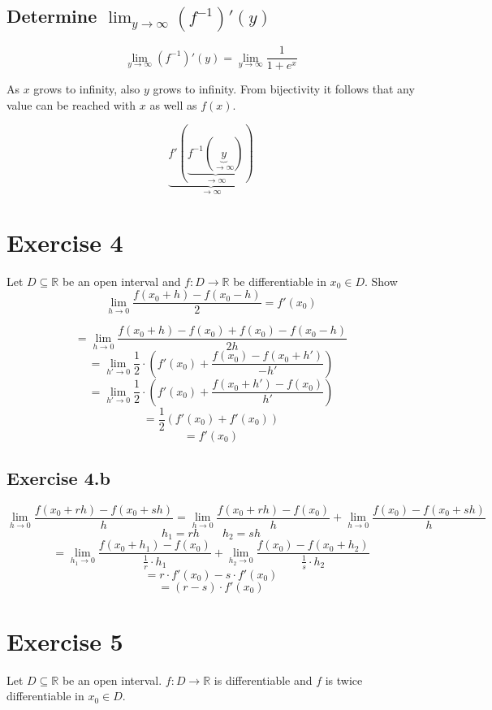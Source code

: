 \documentclass[a4paper]{article}
\theoremstyle{definition}
\begin{document}
\subsection{Determine $\lim_{y\to\infty} \left(f^{-1}\right)'(y)$}
%
\[
  \lim_{y\to\infty} \left(f^{-1}\right)'(y)
  = \lim_{y\to\infty} \frac{1}{1 + e^x}
\]

As $x$ grows to infinity, also $y$ grows to infinity.
From bijectivity it follows that any value can be reached with $x$ as well as $f(x)$.

\[ \underbrace{f'(\underbrace{f^{-1}(\underbrace{y}_{\to\infty})}_{\to\infty})}_{\to\infty} \]

\section{Exercise 4}
\begin{ex}
  Let $D \subseteq \mathbb R$ be an open interval and $f: D \to \mathbb R$ be differentiable
  in $x_0 \in D$.
  Show
  \[ \lim_{h\to0} \frac{f(x_0 + h) - f(x_0 - h)}{2} = f'(x_0) \]
\end{ex}

\[ = \lim_{h\to0} \frac{f(x_0 + h) - f(x_0) + f(x_0) - f(x_0 - h)}{2h} \]
\[ = \lim_{h'\to 0} \frac12 \cdot \left(f'(x_0) + \frac{f(x_0) - f(x_0 + h')}{-h'}\right) \]
\[ = \lim_{h'\to 0} \frac12 \cdot \left(f'(x_0) + \frac{f(x_0 + h') - f(x_0)}{h'}\right) \]
\[ = \frac12 (f'(x_0) + f'(x_0)) \]
\[ = f'(x_0) \]

\subsection{Exercise 4.b}
\[
  \lim_{h\to0} \frac{f(x_0 + rh) - f(x_0 + sh)}{h}
    = \lim_{h\to0} \frac{f(x_0 + rh) - f(x_0)}{h}
    + \lim_{h\to0} \frac{f(x_0) - f(x_0 + sh)}{h}
\]
\[ h_1 = rh \qquad h_2 = sh \]
\[ = \lim_{h_1\to0} \frac{f(x_0 + h_1) - f(x_0)}{\frac1r \cdot h_1} + \lim_{h_2\to0} \frac{f(x_0) - f(x_0 + h_2)}{\frac1s \cdot h_2} \]
\[ = r \cdot f'(x_0) - s \cdot f'(x_0) \]
\[ = (r-s) \cdot f'(x_0) \]

\section{Exercise 5}
\begin{ex}
  Let $D \subseteq \mathbb R$ be an open interval. $f: D \to \mathbb R$ is differentiable
  and $f$ is twice differentiable in $x_0 \in D$.
\end{ex}
\end{document}
